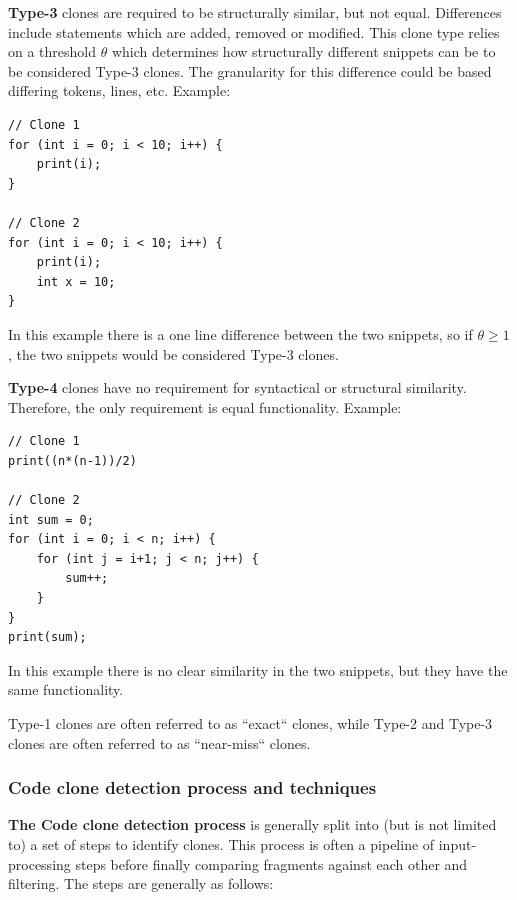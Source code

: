 \documentclass[12pt]{article}
\begin{document}
\textbf{Type-3} clones are required to be structurally similar, but not equal. Differences
include statements which are added, removed or modified. This clone type relies on a
threshold $\theta$ which determines how structurally different snippets can be to be
considered Type-3 clones\cite{Inoue_introduction_to_cc}. The granularity for this
difference could be based differing tokens, lines, etc. Example:

\begin{lstlisting}
// Clone 1
for (int i = 0; i < 10; i++) {
    print(i);
}

// Clone 2
for (int i = 0; i < 10; i++) {
    print(i);
    int x = 10;
}
\end{lstlisting}

In this example there is a one line difference between the two snippets, so if $\theta
	\geq
	1$, the two snippets would be considered Type-3 clones.

\textbf{Type-4} clones have no requirement for syntactical or structural similarity. Therefore,
the only requirement is equal functionality. Example:
\begin{lstlisting}
// Clone 1
print((n*(n-1))/2)

// Clone 2
int sum = 0;
for (int i = 0; i < n; i++) {
    for (int j = i+1; j < n; j++) {
        sum++;
    }
}
print(sum);
\end{lstlisting}

In this example there is no clear similarity in the two snippets, but they have the same
functionality.

Type-1 clones are often referred to as ``exact`` clones, while Type-2 and Type-3 clones are
often referred to as ``near-miss`` clones\cite[1]{Zibran_real_time_search}.

\subsubsection{Code clone detection process and techniques}

\textbf{The Code clone detection process} is generally split into (but is not limited to)
a set of steps to identify clones\cite{Inoue_introduction_to_cc}. This
process is often a pipeline of input-processing steps before finally comparing fragments
against each other and filtering. The steps are generally as follows:
\end{document}
